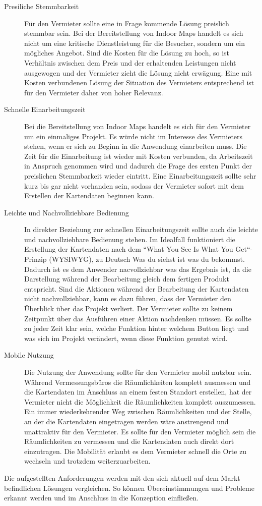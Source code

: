 \begin{description}
	\item[Presiliche Stemmbarkeit]
	Für den Vermieter sollte eine in Frage kommende Lösung preislich stemmbar sein.
	Bei der Bereitstellung von Indoor Maps handelt es sich nicht um eine kritische Dienstleistung für die Besucher, sondern um ein mögliches Angebot.
	Sind die Kosten für die Lösung zu hoch, so ist Verhältnis zwischen dem Preis und der erhaltenden Leistungen nicht ausgewogen und der Vermieter zieht die Lösung nicht erwägung.\pbreak%
	Eine mit Kosten verbundenen Lösung der Situation des Vermieters entsprechend ist für den Vermieter daher von hoher Relevanz.
	\item[Schnelle Einarbeitungszeit]
	Bei die Bereitstellung von Indoor Maps handelt es sich für den Vermieter um ein einmaliges Projekt.
	Es würde nicht im Interesse des Vermieters stehen, wenn er sich zu Beginn in die Anwendung einarbeiten muss.
	Die Zeit für die Einarbeitung ist wieder mit Kosten verbunden, da Arbeitszeit in Anspruch genommen wird und dadurch die Frage des ersten Punkt der preislichen Stemmbarkeit wieder eintritt.\pbreak%
	Eine Einarbeitungszeit sollte sehr kurz bis gar nicht vorhanden sein, sodass der Vermieter sofort mit dem Erstellen der Kartendaten beginnen kann.
	\item[Leichte und Nachvollziehbare Bedienung]
	In direkter Beziehung zur schnellen Einarbeitungszeit sollte auch die leichte und nachvollziehbare Bedienung stehen.
	Im Idealfall funktioniert die Erstellung der Kartendaten nach dem ``What You See Is What You Get``-Prinzip (WYSIWYG), zu Deutsch Was du siehst ist was du bekommst.
	Dadurch ist es dem Anwender nacvollziehbar was das Ergebnis ist, da die Darstellung während der Bearbeitung gleich dem fertigen Produkt entspricht.
	Sind die Aktionen während der Bearbeitung der Kartendaten nicht nachvollziehbar, kann es dazu führen, dass der Vermieter den Überblick über das Projekt verliert.\pbreak%
	Der Vermieter sollte zu keinem Zeitpunkt über das Ausführen einer Aktion nachdenken müssen.
	Es sollte zu jeder Zeit klar sein, welche Funktion hinter welchem Button liegt und was sich im Projekt verändert, wenn diese Funktion genutzt wird.
	\item[Mobile Nutzung]
	Die Nutzung der Anwendung sollte für den Vermieter mobil nutzbar sein.
	Während Vermessungsbüros die Räumlichkeiten komplett ausmessen und die Kartendaten im Anschluss an einem festen Standort erstellen, hat der Vermieter nicht die Möglichkeit die Räumlichkeiten komplett auszumessen.
	Ein immer wiederkehrender Weg zwischen Räumlichkeiten und der Stelle, an der die Kartendaten eingetragen werden wäre anstrengend und unattraktiv für den Vermieter.\pbreak%
	Es sollte für den Vermieter möglich sein die Räumlichkeiten zu vermessen und die Kartendaten auch direkt dort einzutragen.
	Die Mobilität erlaubt es dem Vermieter schnell die Orte zu wechseln und trotzdem weiterzuarbeiten.\pagebreak
\end{description}
Die aufgestellten Anforderungen werden mit den sich aktuell auf dem Markt befindlichen Lösungen vergleichen.
So können Übereinstimmungen und Probleme erkannt werden und im Anschluss in die Konzeption einfließen.

